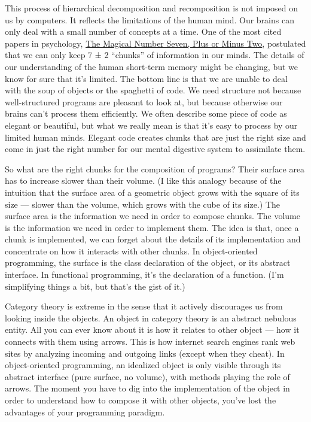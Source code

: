 This process of hierarchical decomposition and recomposition is not
imposed on us by computers. It reflects the limitations of the human
mind. Our brains can only deal with a small number of concepts at a
time. One of the most cited papers in psychology,
\href{http://en.wikipedia.org/wiki/The_Magical_Number_Seven,_Plus_or_Minus_Two}{The
Magical Number Seven, Plus or Minus Two}, postulated that we can only
keep 7 ± 2 ``chunks'' of information in our minds. The details of our
understanding of the human short-term memory might be changing, but we
know for sure that it's limited. The bottom line is that we are unable
to deal with the soup of objects or the spaghetti of code. We need
structure not because well-structured programs are pleasant to look at,
but because otherwise our brains can't process them efficiently. We
often describe some piece of code as elegant or beautiful, but what we
really mean is that it's easy to process by our limited human minds.
Elegant code creates chunks that are just the right size and come in
just the right number for our mental digestive system to assimilate
them.

So what are the right chunks for the composition of programs? Their
surface area has to increase slower than their volume. (I like this
analogy because of the intuition that the surface area of a geometric
object grows with the square of its size --- slower than the volume,
which grows with the cube of its size.) The surface area is the
information we need in order to compose chunks. The volume is the
information we need in order to implement them. The idea is that, once a
chunk is implemented, we can forget about the details of its
implementation and concentrate on how it interacts with other chunks. In
object-oriented programming, the surface is the class declaration of the
object, or its abstract interface. In functional programming, it's the
declaration of a function. (I'm simplifying things a bit, but that's the
gist of it.)

Category theory is extreme in the sense that it actively discourages us
from looking inside the objects. An object in category theory is an
abstract nebulous entity. All you can ever know about it is how it
relates to other object --- how it connects with them using arrows. This
is how internet search engines rank web sites by analyzing incoming and
outgoing links (except when they cheat). In object-oriented programming,
an idealized object is only visible through its abstract interface (pure
surface, no volume), with methods playing the role of arrows. The moment
you have to dig into the implementation of the object in order to
understand how to compose it with other objects, you've lost the
advantages of your programming paradigm.

